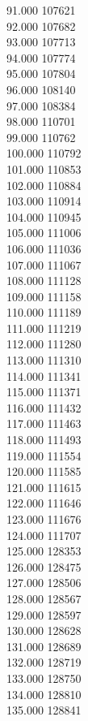 { 91.000	107621 \\
 92.000	107682 \\
 93.000	107713 \\
 94.000	107774 \\
 95.000	107804 \\
 96.000	108140 \\
 97.000	108384 \\
 98.000	110701 \\
 99.000	110762 \\
 100.000	110792 \\
 101.000	110853 \\
 102.000	110884 \\
 103.000	110914 \\
 104.000	110945 \\
 105.000	111006 \\
 106.000	111036 \\
 107.000	111067 \\
 108.000	111128 \\
 109.000	111158 \\
 110.000	111189 \\
 111.000	111219 \\
 112.000	111280 \\
 113.000	111310 \\
 114.000	111341 \\
 115.000	111371 \\
 116.000	111432 \\
 117.000	111463 \\
 118.000	111493 \\
 119.000	111554 \\
 120.000	111585 \\
 121.000	111615 \\
 122.000	111646 \\
 123.000	111676 \\
 124.000	111707 \\
 125.000	128353 \\
 126.000	128475 \\
 127.000	128506 \\
 128.000	128567 \\
 129.000	128597 \\
 130.000	128628 \\
 131.000	128689 \\
 132.000	128719 \\
 133.000	128750 \\
 134.000	128810 \\
 135.000	128841 \\
}
